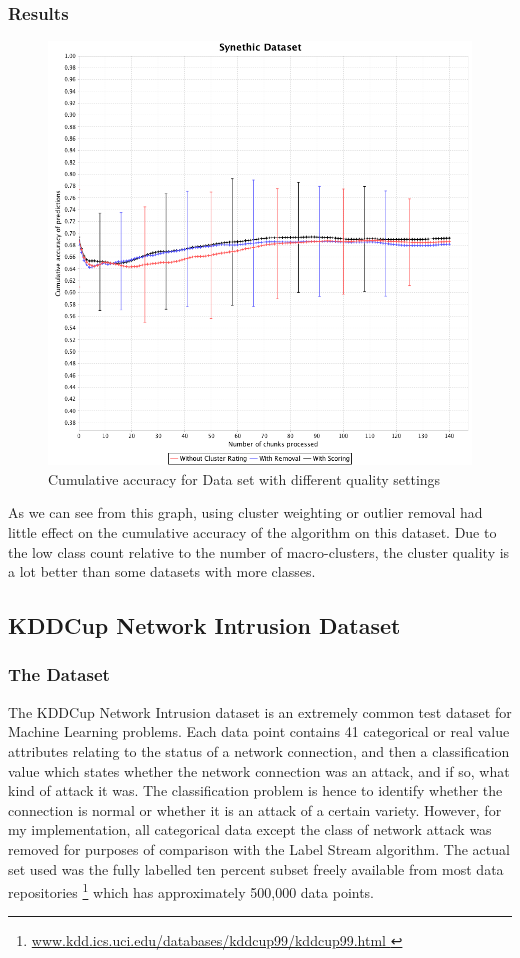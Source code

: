 \documentclass[12pt,a4paper,oneside]{report}
\begin{document}
\subsubsection*{Results}
\begin{figure}
	\includegraphics[scale=0.4]{SyndLine}
	\caption{Cumulative accuracy for Data set with different quality settings}
\end{figure}

As we can see from this graph, using cluster weighting or outlier removal had little effect on the cumulative accuracy of the algorithm on this dataset.  Due to the low class count relative to the number of macro-clusters, the cluster quality is a lot better than some datasets with more classes. 


\subsection*{KDDCup Network Intrusion Dataset}
\subsubsection*{The Dataset}

The KDDCup Network Intrusion dataset is an extremely common test dataset for Machine Learning problems. Each data point contains 41 categorical or real value attributes relating to the status of a network connection, and then a classification value which states whether the network connection was an attack, and if so, what kind of attack it was. The classification problem is hence to identify whether the connection is normal or whether it is an attack of a certain variety. However, for my implementation, all categorical data except the class of network attack was removed for purposes of comparison with the Label Stream algorithm. The actual set used was the fully labelled ten percent subset freely available from most data repositories \footnote{\url{ www.kdd.ics.uci.edu/databases/kddcup99/kddcup99.html } } which has approximately 500,000 data points.    
\end{document}
